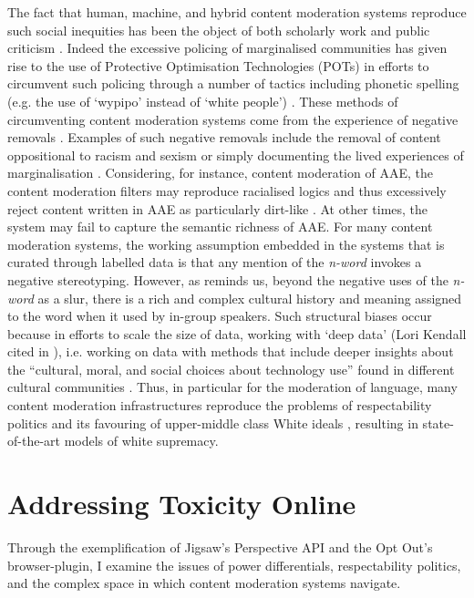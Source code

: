 The fact that human, machine, and hybrid content moderation systems reproduce such social inequities has been the object of both scholarly work \cite{Davidson:2019,Sap:2019,Dixon:2018,Dias:2021} and public criticism \cite{Guynn:2019}.
Indeed the excessive policing of marginalised communities has given rise to the use of Protective Optimisation Technologies (POTs) \cite{Kulynych:2020} in efforts to circumvent such policing through a number of tactics including phonetic spelling (e.g. the use of `wypipo' instead of `white people') \cite{Guynn:2019}. 
These methods of circumventing content moderation systems come from the experience of negative removals \cite{Guynn:2019}. 
Examples of such negative removals include the removal of content oppositional to racism and sexism or simply documenting the lived experiences of marginalisation \citep{Kirtz:2021}.
Considering, for instance, content moderation of AAE, the content moderation filters may reproduce racialised logics and thus excessively reject content written in AAE as particularly dirt-like \cite{Waseem:2018}. 
At other times, the system may fail to capture the semantic richness of AAE. 
For many content moderation systems, the working assumption embedded in the systems  \cite{Davidson:2019} that is curated through labelled data \cite{Waseem:2018} is that any mention of the \textit{n-word} invokes a negative stereotyping. 
However, as \citet{Rahman:2012} reminds us, beyond the negative uses of the \textit{n-word} as a slur, there is a rich and complex cultural history and meaning assigned to the word when it used by in-group speakers. 
Such structural biases occur because in efforts to scale the size of data, working with `deep data' (Lori Kendall cited in \citet{Brock:2015}), i.e. working on data with methods that include deeper insights about the ``cultural, moral, and social choices about technology use'' found in different cultural communities \cite{Brock:2015}.
Thus, in particular for the moderation of language, many content moderation infrastructures reproduce the problems of respectability politics and its favouring of upper-middle class White ideals \cite{Kerrison:2018}, resulting in state-of-the-art models of white supremacy.

\section{Addressing Toxicity Online}\label{sec:filter_models}

Through the exemplification of Jigsaw's Perspective API and the Opt Out's browser-plugin, I examine the issues of power differentials, respectability politics, and the complex space in which content moderation systems navigate.

